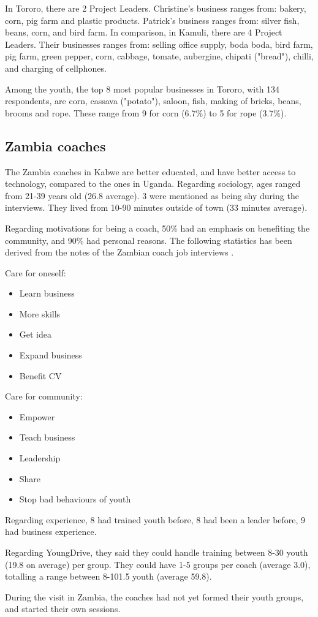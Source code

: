In Tororo, there are 2 Project Leaders. Christine's business ranges from: bakery, corn, pig farm and plastic products. Patrick's business ranges from: silver fish, beans, corn, and bird farm. In comparison, in Kamuli, there are 4 Project Leaders. Their businesses ranges from: selling office supply, boda boda, bird farm, pig farm, green pepper, corn, cabbage, tomate, aubergine, chipati ("bread"), chilli, and charging of cellphones.

Among the youth, the top 8 most popular businesses in Tororo, with 134 respondents, are corn, cassava ("potato"), saloon, fish, making of bricks, beans, brooms and rope. These range from 9 for corn (6.7\%) to 5 for rope (3.7\%).

\subsection{Zambia coaches}
The Zambia coaches in Kabwe are better educated, and have better access to technology, compared to the ones in Uganda. Regarding sociology, ages ranged from 21-39 years old (26.8 average). 3 were mentioned as being shy during the interviews. They lived from 10-90 minutes outside of town (33 minutes average).

Regarding motivations for being a coach, 50\% had an emphasis on benefiting the community, and 90\% had personal reasons. The following statistics has been derived from the notes of the Zambian coach job interviews \cite{yd-zambia-interviews}.

Care for oneself:
\begin{itemize}
\item Learn business %
\item More skills %
\item Get idea
\item Expand business
\item Benefit CV
\end{itemize}

Care for community:
\begin{itemize}
\item Empower %
\item Teach business
\item Leadership
\item Share
\item Stop bad behaviours of youth
\end{itemize}

Regarding experience, 8 had trained youth before, 8 had been a leader before, 9 had business experience.

Regarding YoungDrive, they said they could handle training between 8-30 youth (19.8 on average) per group. They could have 1-5 groups per coach (average 3.0), totalling a range between 8-101.5 youth (average 59.8).

During the visit in Zambia, the coaches had not yet formed their youth groups, and started their own sessions.
